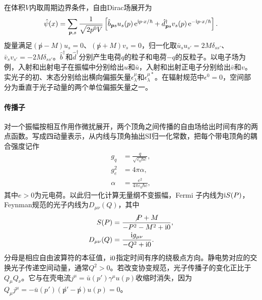 在体积$V$内取周期边界条件，自由Dirac场展开为
\begin{equation}
    \label{eq:ed-dirac-field-expansion}
    \hat\psi(x) = \sum_{\bm p,s}\frac{1}{\sqrt{2p^0 V}}
    \left[\hat b_{\bm p s}u_s(p)\mathop{}\!\mathrm{e}^{\mathrm{i} p\cdot x/\hbar}
    + \hat d_{\bm p s}^\dagger v_s(p)\mathop{}\!\mathrm{e}^{-\mathrm{i} p\cdot x/\hbar}\right].
\end{equation}
旋量满足$(\not p - M)u_s = 0$、$(\not p + M)v_s = 0$，归一化取$\bar u_s u_{s'} = 2M\delta_{ss'}$、$\bar v_s v_{s'} = -2M\delta_{ss'}$。$\hat b^\dagger$和$\hat d^\dagger$分别产生电荷$q$的粒子和电荷$-q$的反粒子。以电子场为例，入射和出射电子在振幅中分别给出$u$和$\bar u$，入射和出射正电子分别给出$\bar v$和$v$。实光子的初、末态分别给出横向偏振矢量$\epsilon^\mu_\lambda$和$\epsilon^{\mu *}_\lambda$。在辐射规范中$\epsilon^0 = 0$，空间部分为垂直于光子动量的两个单位偏振矢量之一。

\paragraph{传播子}
对一个振幅按相互作用作微扰展开，两个顶角之间传播的自由场给出时间有序的两点函数。写成四动量表示，从内线与顶角抽出SI归一化常数，把每个带电顶角的耦合强度记作
\begin{subequations}
    \label{eq:ed-qed-charge-convention}
    \begin{align}
        g_q &= \frac{q}{\sqrt{\varepsilon_0\hbar c}},\\
        g_e^2 &= 4\pi\alpha,\\
        \alpha &= \frac{e^2}{4\pi\varepsilon_0\hbar c},
    \end{align}
\end{subequations}
其中$e > 0$为元电荷。以此归一化计算无量纲不变振幅，Fermi 子内线为$\mathrm{i} S(P)$，Feynman规范的光子内线为$D_{\mu\nu}(Q)$，其中
\begin{subequations}\label{eq:qed propagators}
    \begin{align}
        S(P) &= \frac{\not P + M}{-P^2 - M^2 + \mathrm{i}0},\\
        D_{\mu\nu}(Q) &= \frac{\mathrm{i} g_{\mu\nu}}{-Q^2 + \mathrm{i}0}.
    \end{align}
\end{subequations}
分母是相应自由波算符的本征值，$\mathrm{i}0$指定时间有序的绕极点方向。静电势对应的交换光子传递空间动量，通常$Q^2 > 0$。若改变协变规范，光子传播子的变化正比于$Q_\mu Q_\nu$。它与在壳电流$j^\mu = \bar u(p')\gamma^\mu u(p)$收缩时消失，因为$Q_\mu j^\mu = -\bar u(p')(\not p' - \not p)u(p) = 0$。

